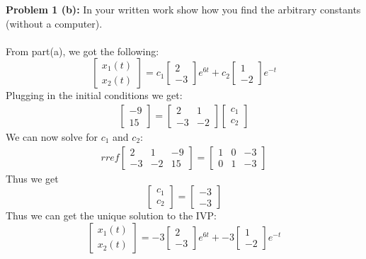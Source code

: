 \documentclass[12pt]{article}
\begin{document}
\noindent \textbf{Problem 1 (b): }In your written work show how you find the arbitrary constants (without a computer).
\\ \\
From part(a), we got the following:
	$$
	\begin{bmatrix} x_1(t) \\ x_2(t) \end{bmatrix} =
	c_1 \begin{bmatrix}	2 \\ -3	\end{bmatrix} e^{6t} +
	c_2 \begin{bmatrix}	1 \\ -2	\end{bmatrix} e^{-t}
	$$	
Plugging in the initial conditions we get:
	\begin{align*}
		\begin{bmatrix} -9 \\ 15 \end{bmatrix} =
		\begin{bmatrix}	2  & 1 \\ -3 & -2	\end{bmatrix}
		\begin{bmatrix}	c_1 \\ c_2	\end{bmatrix}
	\end{align*}
We can now solve for $c_1$ and $c_2$:
	\begin{align*}
		rref
		\begin{bmatrix}
			2  & 1 & -9 \\ 
			-3 & -2	& 15
		\end{bmatrix} = 
		\begin{bmatrix}
			1 & 0 & -3 \\
			0 & 1 & -3
		\end{bmatrix}
	\end{align*}
Thus we get
	$$
	\begin{bmatrix}	c_1 \\ c_2	\end{bmatrix} = \begin{bmatrix}	-3 \\ -3	\end{bmatrix}
	$$
Thus we can get the unique solution to the IVP:
	$$
	\begin{bmatrix} x_1(t) \\ x_2(t) \end{bmatrix} =
	-3 \begin{bmatrix}	2 \\ -3	\end{bmatrix} e^{6t} +
	-3 \begin{bmatrix}	1 \\ -2	\end{bmatrix} e^{-t}
	$$
\end{document}
